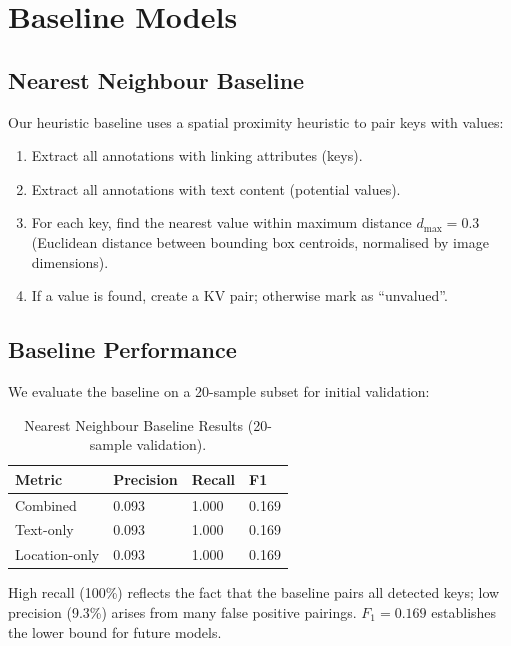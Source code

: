 \section{Baseline Models}
\label{sec:baseline-models}

\subsection{Nearest Neighbour Baseline}
\label{sec:nn-baseline}

Our heuristic baseline uses a spatial proximity heuristic to pair keys with
values:
\begin{enumerate}
  \item Extract all annotations with linking attributes (keys).
  \item Extract all annotations with text content (potential values).
  \item For each key, find the nearest value within maximum distance
  $d_{\max} = 0.3$ (Euclidean distance between bounding box centroids,
  normalised by image dimensions).
  \item If a value is found, create a KV pair; otherwise mark as
  ``unvalued''.
\end{enumerate}

\subsection{Baseline Performance}
\label{sec:baseline-performance}

We evaluate the baseline on a 20-sample subset for initial validation:

\begin{table}[h]
  \centering
  \caption{Nearest Neighbour Baseline Results (20-sample validation).}
  \label{tab:nn-baseline}
  \begin{tabular}{llll}
    \hline
    \textbf{Metric} & \textbf{Precision} & \textbf{Recall} & \textbf{F1} \\
    \hline
    Combined & 0.093 & 1.000 & 0.169 \\
    Text-only & 0.093 & 1.000 & 0.169 \\
    Location-only & 0.093 & 1.000 & 0.169 \\
    \hline
  \end{tabular}
\end{table}

High recall (100\%) reflects the fact that the baseline pairs all detected
keys; low precision (9.3\%) arises from many false positive pairings.
$F_1 = 0.169$ establishes the lower bound for future models.

